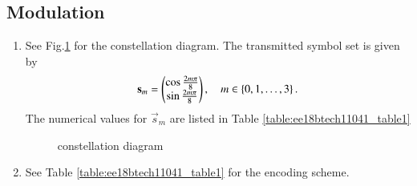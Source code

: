 \subsection{Modulation}
\begin{enumerate}[label=\thesubsection.\arabic*.,ref=\thesubsection.\theenumi]



\item See Fig.\ref{fig:ee18btech11041_fig1} for the constellation diagram.  The transmitted symbol set is given by 
\begin{align}
\mathbf{s}_m = \begin{pmatrix}\cos \frac{2m\pi}{8}\\ \sin \frac{2m\pi}{8}\end{pmatrix}, \quad m \in \left\{0, 1, \dots, 3\right\}.
\end{align}
%
The numerical values for $\vec{s}_m$ are listed in Table \ref{table:ee18btech11041_table1}

\begin{figure}[!ht]
                \resizebox{\columnwidth}{!}{}

\caption{constellation diagram}
\label{fig:ee18btech11041_fig1}
\end{figure}

%
\item See Table \ref{table:ee18btech11041_table1} for the encoding scheme.


\begin{table}[!ht]
\centering

\caption{}
\label{table:ee18btech11041_table1}
\end{table}


\end{enumerate}
